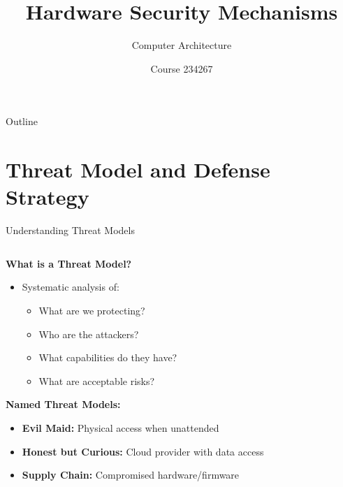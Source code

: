 \documentclass[aspectratio=169,12pt]{beamer}
\title{Hardware Security Mechanisms}
\subtitle{Computer Architecture}
\author{Course 234267}
\date{}
\begin{document}
\frame{\titlepage}

\begin{frame}{Outline}
    \tableofcontents
\end{frame}


\section{Threat Model and Defense Strategy}

\begin{frame}{Understanding Threat Models}
    \begin{columns}
        \begin{column}{0.5\textwidth}
            \textbf{What is a Threat Model?}
            \begin{itemize}
                \item Systematic analysis of:
                \begin{itemize}
                    \item What are we protecting?
                    \item Who are the attackers?
                    \item What capabilities do they have?
                    \item What are acceptable risks?
                \end{itemize}
            \end{itemize}
            
            \vspace{0.3cm}
            \textbf{Named Threat Models:}
            \begin{itemize}
                \item \textbf{Evil Maid:} Physical access when unattended
                \item \textbf{Honest but Curious:} Cloud provider with data access
                \item \textbf{Supply Chain:} Compromised hardware/firmware
            \end{itemize}
            

\end{column}
\end{columns}
\end{frame}
\end{document}
